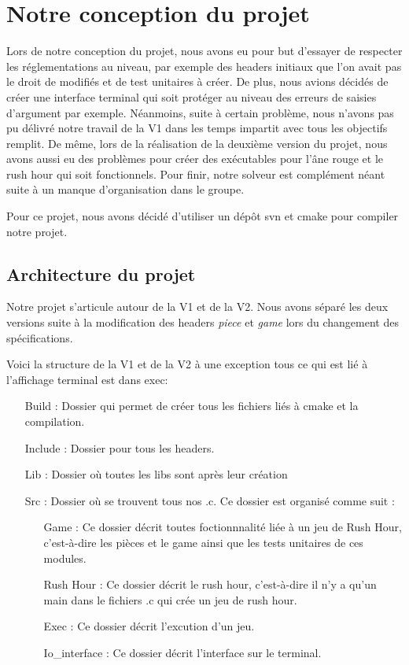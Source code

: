 \documentclass{report}
\begin{document}
\chapter{Notre conception du projet}
\setcounter{section}{0}
Lors de notre conception du projet, nous avons eu pour but d'essayer de respecter les réglementations au niveau, par exemple des headers initiaux que l'on avait pas le droit de modifiés et de test unitaires  à créer. De plus, nous avions décidés de créer une interface terminal qui soit protéger au niveau des erreurs de saisies d'argument par exemple. Néanmoins, suite à certain problème, nous n'avons pas pu délivré notre travail de la V1 dans les temps impartit avec tous les objectifs remplit. De même, lors de la réalisation de la deuxième version du projet, nous avons aussi eu des problèmes pour créer des exécutables pour l'âne rouge et le rush hour qui soit fonctionnels. Pour finir, notre solveur est complément néant suite à un manque d'organisation dans le groupe.

Pour ce projet, nous avons décidé d'utiliser un dépôt svn et cmake pour compiler notre projet.
\section{Architecture du projet}
Notre projet s'articule autour de la V1 et de la V2. Nous avons séparé les deux versions suite à la modification des headers \textit{piece} et \textit{game} lors du changement des spécifications.

Voici la structure de la V1 et de la V2 à une exception tous ce qui est lié à l'affichage terminal est dans exec:

\begin{itemize}
\item[Build :]Dossier qui permet de créer tous les fichiers liés à cmake et la compilation.
\item[Include :]Dossier pour tous les headers.
\item[Lib :]Dossier où toutes les libs sont après leur création
\item[Src :]Dossier où se trouvent tous nos .c. Ce dossier est organisé comme suit :
  \begin{itemize}
  \item[Game :]Ce dossier décrit toutes foctionnnalité liée à un jeu de Rush Hour, c'est-à-dire les pièces et le game ainsi que les tests unitaires de ces modules.
  \item[Rush Hour :]Ce dossier décrit le rush hour, c'est-à-dire il n'y a qu'un main dans le fichiers .c qui crée un jeu de rush hour. 
  \item[Exec :]Ce dossier décrit l'excution d'un jeu.
  \item[Io\_interface :]Ce dossier décrit l'interface sur le terminal.
  \end{itemize}
\end{itemize}
\end{document}
